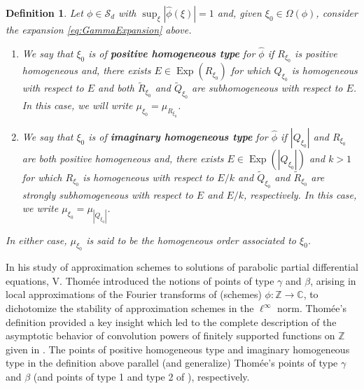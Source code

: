 \documentclass[11pt, letter]{book}
\newtheorem{definition}[theorem]{Definition}
\newcommand\Exp{\operatorname{Exp}}
\begin{document}
\begin{framed}
\begin{definition}\label{def:Types}
Let $\phi\in\mathcal{S}_d$ with $\sup_{\xi}|\widehat{\phi}(\xi)|=1$ and, given $\xi_0\in\Omega(\phi)$, consider the expansion \eqref{eq:GammaExpansion} above.
\begin{enumerate}
    \item We say that $\xi_0$ is of \textbf{positive homogeneous type} for $\widehat{\phi}$ if $R_{\xi_0}$ is positive homogeneous and, there exists $E\in \Exp(R_{\xi_0})$ for which $Q_{\xi_0}$ is homogeneous with respect to $E$ and both $\widetilde{R}_{\xi_0}$ and $\widetilde{Q}_{\xi_0}$ are subhomogeneous with respect to $E$. In this case, we will write  $\mu_{\xi_0}=\mu_{R_{\xi_0}}$.
\item We say that $\xi_0$ is of \textbf{imaginary homogeneous type} for $\widehat{\phi}$ if $|Q_{\xi_0}|$ and $R_{\xi_0}$ are both positive homogeneous and, there exists $E\in\Exp(|Q_{\xi_0}|)$ and $k>1$ for which $R_{\xi_0}$ is homogeneous with respect to $E/k$ and $\widetilde{Q}_{\xi_0}$ and $\widetilde{R}_{\xi_0}$ are strongly subhomogeneous with respect to $E$ and $E/k$, respectively. In this case, we write $\mu_{\xi_0}=\mu_{|Q_{\xi_0}|}$.
\end{enumerate}
In either case, $\mu_{\xi_0}$ is said to be the homogeneous order associated to $\xi_0$.
\end{definition}
\end{framed}

\noindent In his study of approximation schemes to solutions of parabolic partial differential equations, V. Thom\'{e}e introduced the notions of points of type $\gamma$ and $\beta$, arising in local approximations of the Fourier transforms of (schemes) $\phi:\mathbb{Z}\to\mathbb{C}$, to dichotomize the stability of approximation schemes in the $\ell^\infty$ norm\cite{thomee_stability_1965}. Thom\'{e}e's definition provided a key insight which led to the complete description of the asymptotic behavior of convolution powers of finitely supported functions on $\mathbb{Z}$ given in \cite{randles_convolution_2015}. The points of positive homogeneous type and imaginary homogeneous type in the definition above parallel (and generalize) Thom\'{e}e's points of type $\gamma$ and $\beta$ (and points of type 1 and type 2 of \cite{randles_convolution_2015}), respectively.\\
\end{document}
